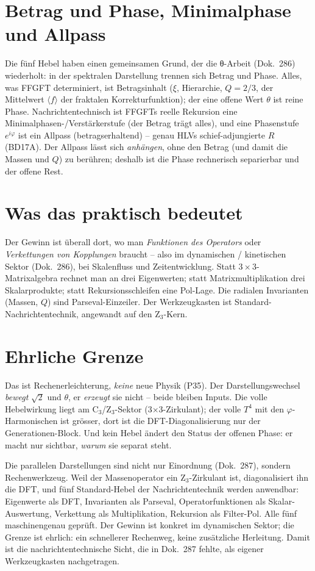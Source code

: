 \section{Betrag und Phase, Minimalphase und Allpass}
Die fünf Hebel haben einen gemeinsamen Grund, der die θ-Arbeit (Dok.~286) wiederholt: in der
spektralen Darstellung trennen sich Betrag und Phase. Alles, was FFGFT determiniert, ist
Betragsinhalt ($\xi$, Hierarchie, $Q=2/3$, der Mittelwert $\langle f\rangle$ der fraktalen Korrekturfunktion); der eine offene Wert $\theta$ ist
reine Phase. Nachrichtentechnisch ist FFGFTs reelle Rekursion eine Minimalphasen-/Verstärkerstufe
(der Betrag trägt alles), und eine Phasenstufe $e^{i\varphi}$ ist ein Allpass (betragserhaltend) --
genau HLVs schief-adjungierte $R$ (BD17A). Der Allpass lässt sich \emph{anhängen}, ohne den Betrag
(und damit die Massen und $Q$) zu berühren; deshalb ist die Phase rechnerisch separierbar und der
offene Rest.

\section{Was das praktisch bedeutet}
Der Gewinn ist überall dort, wo man \emph{Funktionen des Operators} oder \emph{Verkettungen von
Kopplungen} braucht -- also im dynamischen / kinetischen Sektor (Dok.~286), bei Skalenfluss und
Zeitentwicklung. Statt $3\times3$-Matrixalgebra rechnet man an drei Eigenwerten; statt
Matrixmultiplikation drei Skalarprodukte; statt Rekursionsschleifen eine Pol-Lage. Die radialen
Invarianten (Massen, $Q$) sind Parseval-Einzeiler. Der Werkzeugkasten ist Standard-Nachrichtentechnik,
angewandt auf den Z$_3$-Kern.

\section{Ehrliche Grenze}
\begin{important}
Das ist Rechenerleichterung, \emph{keine} neue Physik (P35). Der Darstellungswechsel \emph{bewegt}
$\sqrt2$ und $\theta$, er \emph{erzeugt} sie nicht -- beide bleiben Inputs. Die volle Hebelwirkung
liegt am C$_3$/Z$_3$-Sektor (3$\times$3-Zirkulant); der volle $T^4$ mit den $\varphi$-Harmonischen ist
grösser, dort ist die DFT-Diagonalisierung nur der Generationen-Block. Und kein Hebel ändert den
Status der offenen Phase: er macht nur sichtbar, \emph{warum} sie separat steht.
\end{important}

\begin{conclusionBox}
Die parallelen Darstellungen sind nicht nur Einordnung (Dok.~287), sondern Rechenwerkzeug. Weil der
Massenoperator ein Z$_3$-Zirkulant ist, diagonalisiert ihn die DFT, und fünf Standard-Hebel der
Nachrichtentechnik werden anwendbar: Eigenwerte als DFT, Invarianten als Parseval, Operatorfunktionen
als Skalar-Auswertung, Verkettung als Multiplikation, Rekursion als Filter-Pol. Alle fünf
maschinengenau geprüft. Der Gewinn ist konkret im dynamischen Sektor; die Grenze ist ehrlich: ein
schnellerer Rechenweg, keine zusätzliche Herleitung. Damit ist die nachrichtentechnische Sicht, die
in Dok.~287 fehlte, als eigener Werkzeugkasten nachgetragen.
\end{conclusionBox}
